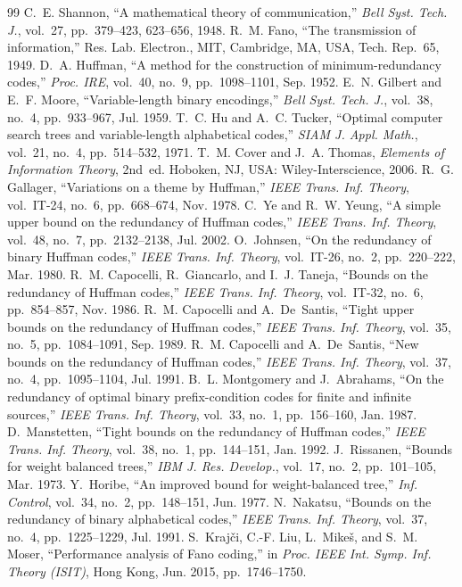 \documentclass[journal]{IEEEtran}
\theoremstyle{definition}
\begin{document}
\begin{thebibliography}{99}
 C.~E. Shannon, ``A mathematical theory of communication,''
\emph{Bell Syst. Tech. J.}, vol.~27, pp.~379--423, 623--656, 1948.
 R.~M. Fano, ``The transmission of information,'' Res. Lab.
Electron., MIT, Cambridge, MA, USA, Tech. Rep.~65, 1949.
 D.~A. Huffman, ``A method for the construction of
minimum-redundancy codes,'' \emph{Proc. IRE}, vol.~40, no.~9, pp.~1098--1101,
Sep. 1952.
 E.~N. Gilbert and E.~F. Moore, ``Variable-length binary
encodings,'' \emph{Bell Syst. Tech. J.}, vol.~38, no.~4, pp.~933--967,
Jul. 1959.
 T.~C. Hu and A.~C. Tucker, ``Optimal computer search trees
and variable-length alphabetical codes,'' \emph{SIAM J. Appl. Math.}, vol.~21,
no.~4, pp.~514--532, 1971.
 T.~M. Cover and J.~A. Thomas, \emph{Elements of
Information Theory}, 2nd~ed. Hoboken, NJ, USA: Wiley-Interscience, 2006.
 R.~G. Gallager, ``Variations on a theme by Huffman,''
\emph{IEEE Trans. Inf. Theory}, vol.~IT-24, no.~6, pp.~668--674, Nov. 1978.
 C.~Ye and R.~W. Yeung, ``A simple upper bound on the
redundancy of Huffman codes,'' \emph{IEEE Trans. Inf. Theory}, vol.~48, no.~7,
pp.~2132--2138, Jul. 2002.
 O.~Johnsen, ``On the redundancy of binary Huffman codes,''
\emph{IEEE Trans. Inf. Theory}, vol.~IT-26, no.~2, pp.~220--222, Mar. 1980.
 R.~M. Capocelli, R.~Giancarlo, and I.~J.
Taneja, ``Bounds on the redundancy of Huffman codes,'' \emph{IEEE Trans. Inf.
Theory}, vol.~IT-32, no.~6, pp.~854--857, Nov. 1986.
 R.~M. Capocelli and A.~De~Santis, ``Tight upper
bounds on the redundancy of Huffman codes,'' \emph{IEEE Trans. Inf. Theory},
vol.~35, no.~5, pp.~1084--1091, Sep. 1989.
 R.~M. Capocelli and A.~De~Santis, ``New bounds on
the redundancy of Huffman codes,'' \emph{IEEE Trans. Inf. Theory}, vol.~37,
no.~4, pp.~1095--1104, Jul. 1991.
 B.~L. Montgomery and J.~Abrahams, ``On the
redundancy of optimal binary prefix-condition codes for finite and infinite
sources,'' \emph{IEEE Trans. Inf. Theory}, vol.~33, no.~1, pp.~156--160,
Jan. 1987.
 D.~Manstetten, ``Tight bounds on the redundancy of
Huffman codes,'' \emph{IEEE Trans. Inf. Theory}, vol.~38, no.~1, pp.~144--151,
Jan. 1992.
 J.~Rissanen, ``Bounds for weight balanced trees,''
\emph{IBM J. Res. Develop.}, vol.~17, no.~2, pp.~101--105, Mar. 1973.
 Y.~Horibe, ``An improved bound for weight-balanced tree,''
\emph{Inf. Control}, vol.~34, no.~2, pp.~148--151, Jun. 1977.
 N.~Nakatsu, ``Bounds on the redundancy of binary
alphabetical codes,'' \emph{IEEE Trans. Inf. Theory}, vol.~37, no.~4,
pp.~1225--1229, Jul. 1991.
 S.~Kraj\v{c}i, C.-F. Liu, L.~Mike\v{s}, and S.~M. Moser,
``Performance analysis of Fano coding,'' in \emph{Proc. IEEE Int. Symp. Inf.
Theory (ISIT)}, Hong Kong, Jun. 2015, pp.~1746--1750.
\end{thebibliography}
\end{document}
